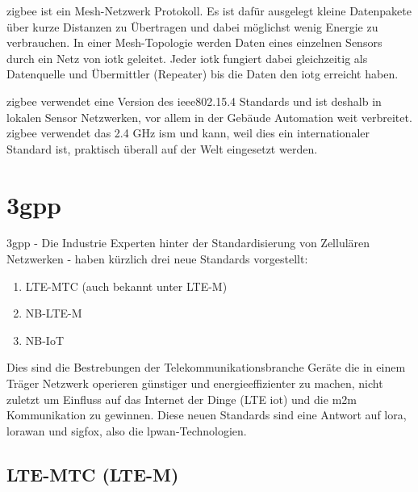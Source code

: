 \gls{zigbee} ist ein Mesh-Netzwerk Protokoll. Es ist dafür ausgelegt kleine Datenpakete über kurze Distanzen zu Übertragen und dabei möglichst wenig Energie zu verbrauchen. In einer Mesh-Topologie werden Daten eines einzelnen Sensors durch ein Netz von \gls{iotk} geleitet. Jeder \gls{iotk} fungiert dabei gleichzeitig als Datenquelle und Übermittler (Repeater) bis die Daten den \gls{iotg} erreicht haben.

\gls{zigbee} verwendet eine Version des \gls{ieee802.15.4} Standards und ist deshalb in lokalen Sensor Netzwerken, vor allem in der Gebäude Automation weit verbreitet. \gls{zigbee} verwendet das 2.4 GHz \gls{ism} und kann, weil dies ein internationaler Standard ist, praktisch überall auf der Welt eingesetzt werden.

\section{\gls{3gpp}}

\gls{3gpp} - Die Industrie Experten hinter der Standardisierung von Zellulären Netzwerken - haben kürzlich drei neue Standards vorgestellt:

\begin{enumerate}
  \item LTE-MTC (auch bekannt unter LTE-M)
  \item NB-LTE-M
  \item NB-IoT
\end{enumerate}

Dies sind die Bestrebungen der Telekommunikationsbranche Geräte die in einem Träger Netzwerk operieren günstiger und energieeffizienter zu machen, nicht zuletzt um Einfluss auf das Internet der Dinge (LTE \acrshort{iot}) und die \acrfull{m2m} Kommunikation zu gewinnen. Diese neuen Standards sind eine Antwort auf \gls{lora}, \gls{lorawan} und \gls{sigfox}, also die \gls{lpwan}-Technologien.

\subsection{LTE-MTC (LTE-M)}

